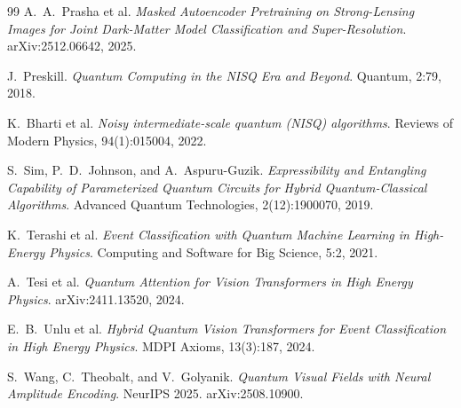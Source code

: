 \documentclass[10pt,letterpaper]{article}
\theoremstyle{plain}
\theoremstyle{definition}
\begin{document}
\begin{thebibliography}{99}
A.~A.~Prasha et al.
\textit{Masked Autoencoder Pretraining on Strong-Lensing Images for Joint
Dark-Matter Model Classification and Super-Resolution}.
arXiv:2512.06642, 2025.

J.~Preskill.
\textit{Quantum Computing in the NISQ Era and Beyond}.
Quantum, 2:79, 2018.

K.~Bharti et al.
\textit{Noisy intermediate-scale quantum ({NISQ}) algorithms}.
Reviews of Modern Physics, 94(1):015004, 2022.

S.~Sim, P.~D.~Johnson, and A.~Aspuru-Guzik.
\textit{Expressibility and Entangling Capability of Parameterized Quantum
Circuits for Hybrid Quantum-Classical Algorithms}.
Advanced Quantum Technologies, 2(12):1900070, 2019.

K.~Terashi et al.
\textit{Event Classification with Quantum Machine Learning in
High-Energy Physics}.
Computing and Software for Big Science, 5:2, 2021.

A.~Tesi et al.
\textit{Quantum Attention for Vision Transformers in High Energy Physics}.
arXiv:2411.13520, 2024.

E.~B.~Unlu et al.
\textit{Hybrid Quantum Vision Transformers for Event Classification in
High Energy Physics}.
MDPI Axioms, 13(3):187, 2024.

S.~Wang, C.~Theobalt, and V.~Golyanik.
\textit{Quantum Visual Fields with Neural Amplitude Encoding}.
NeurIPS 2025. arXiv:2508.10900.

\end{thebibliography}
\end{document}
